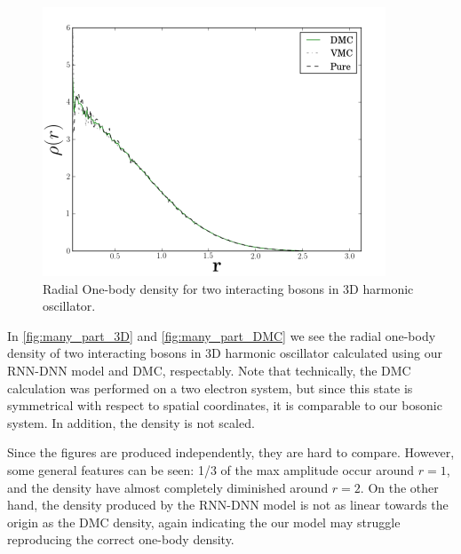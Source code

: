 \begin{figure}[H]
	\includegraphics[scale=0.6]{figures/onebody3d.png}
	\caption{Radial One-body density for two interacting bosons in 3D harmonic
		oscillator. \cite{samseth2019learning}} 
	\label{fig:many_part_DMC}
\end{figure}

In \autoref{fig:many_part_3D} and \autoref{fig:many_part_DMC} we see the radial
one-body density of two interacting bosons in 3D harmonic oscillator calculated
using our RNN-DNN model and DMC, respectably. Note that technically, the DMC
calculation was performed on a two electron system, but since this state is
symmetrical with respect to spatial coordinates, it is comparable to our bosonic
system. In addition, the density is not scaled. 

Since the figures are produced independently, they are hard to compare. However,
some general features can be seen: 1/3 of the max amplitude occur around $r=1$,
and the density have almost completely diminished around $r=2$. On the other
hand, the density produced by the RNN-DNN model is not as linear towards the
origin as the DMC density, again indicating the our model may struggle
reproducing the correct one-body density. 


